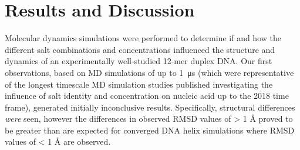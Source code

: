 \documentclass[9pt,lessons]{livecoms}
\begin{document}
\section{Results and Discussion}

Molecular dynamics simulations were performed to determine if and how
the different salt combinations and concentrations influenced the
structure and dynamics of an experimentally well-studied 12-mer duplex
DNA. Our first observations, based on MD simulations of up to
\SI{1}{\micro\second} (which were representative of the longest
timescale MD simulation studies published investigating the influence
of salt identity and concentration on nucleic acid up to the 2018 time
frame), generated initially inconclusive results. Specifically,
structural differences \textit{were} seen, however the differences in
observed RMSD values of > 1 Å proved to be greater than are expected
for converged DNA helix simulations where RMSD values of < 1 Å are
observed\cite{Galindo-Murillo2014,Galindo-Murillo2014a}.
\end{document}
